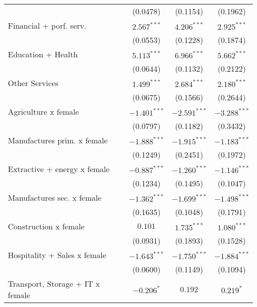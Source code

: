 \begin{tabular}{l|ccc|}
                                 &        (0.0478) &        (0.1154) &        (0.1962) \\
Financial + porf. serv.          &   $2.567^{***}$ &   $4.206^{***}$ &   $2.925^{***}$ \\
                                 &        (0.0553) &        (0.1228) &        (0.1874) \\
Education + Health               &   $5.113^{***}$ &   $6.966^{***}$ &   $5.662^{***}$ \\
                                 &        (0.0644) &        (0.1132) &        (0.2122) \\
Other Services                   &   $1.499^{***}$ &   $2.684^{***}$ &   $2.180^{***}$ \\
                                 &        (0.0675) &        (0.1566) &        (0.2644) \\
Agriculture x female             &  $-1.401^{***}$ &  $-2.591^{***}$ &  $-3.288^{***}$ \\
                                 &        (0.0797) &        (0.1182) &        (0.3432) \\
Manufactures prim. x female      &  $-1.888^{***}$ &  $-1.915^{***}$ &  $-1.183^{***}$ \\
                                 &        (0.1249) &        (0.2451) &        (0.1972) \\
Extractive + energy x female     &  $-0.887^{***}$ &  $-1.260^{***}$ &  $-1.146^{***}$ \\
                                 &        (0.1234) &        (0.1495) &        (0.1047) \\
Manufactures sec. x female       &  $-1.362^{***}$ &  $-1.699^{***}$ &  $-1.498^{***}$ \\
                                 &        (0.1635) &        (0.1048) &        (0.1791) \\
Construction x female            &         $0.101$ &   $1.735^{***}$ &   $1.080^{***}$ \\
                                 &        (0.0931) &        (0.1893) &        (0.1528) \\
Hospitality + Sales x female     &  $-1.643^{***}$ &  $-1.750^{***}$ &  $-1.884^{***}$ \\
                                 &        (0.0600) &        (0.1149) &        (0.1094) \\
Transport, Storage + IT x female &      $-0.206^*$ &         $0.192$ &       $0.219^*$ \\

\end{tabular}
